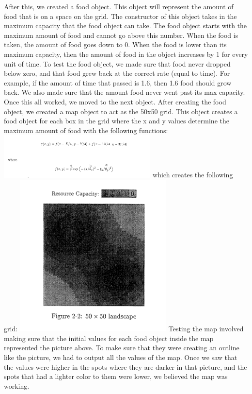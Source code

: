 \documentclass[11pt]{article}
\begin{document}
\begin{multicols}{2}
\newline
After this, we created a food object. This object will represent the amount of food that is on a space on the grid. The constructor of this object takes in the maximum capacity that the food object can take. The food object starts with the maximum amount of food and cannot go above this number. When the food is taken, the amount of food goes down to 0. When the food is lower than its maximum capacity, then the amount of food in the object increases by 1 for every unit of time.
\newline
To test the food object, we made sure that food never dropped below zero, and that food grew back at the correct rate (equal to time). For example, if the amount of time that passed is 1.6, then 1.6 food should grow back. We also made sure that the amount food never went past its max capacity. Once this all worked, we moved to the next object.
\newline
After creating the food object, we created a map object to act as the 50x50 grid. This object creates a food object for each box in the grid where the x and y values determine the maximum amount of food with the following functions: \newline
\includegraphics[width=80mm]{MaxFoodFunction.PNG} \newline
which creates the following grid: \newline
\includegraphics[width=80mm]{ResourceCapacity.PNG} \newline
Testing the map involved making sure that the initial values for each food object inside the map represented the picture above. To make sure that they were creating an outline like the picture, we had to output all the values of the map. Once we saw that the values were higher in the spots where they are darker in that picture, and the spots that had a lighter color to them were lower, we believed the map was working.

\end{multicols}
\end{document}

